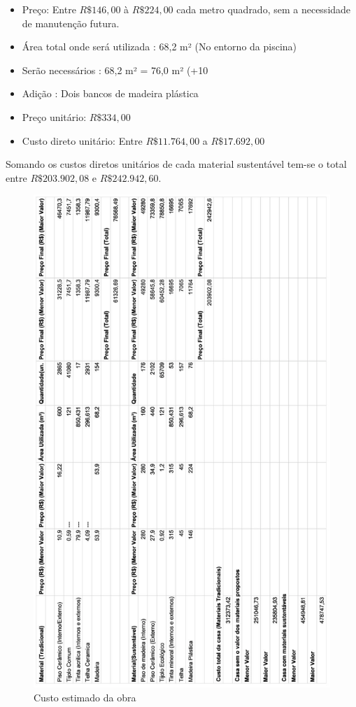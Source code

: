 \begin{itemize}

		\item Preço: Entre $R\$146,00$ à $R\$ 224,00$ cada metro quadrado, sem a necessidade de manutenção futura.

		\item Área total onde será utilizada : 68,2 m² (No entorno da piscina)

		\item Serão necessários :  68,2 m² = 76,0 m² (+10%

		\item Adição : Dois bancos de madeira plástica

		\item Preço unitário: $R\$ 334,00$

		\item Custo direto unitário: Entre $R\$ 11.764,00$ a $R\$17.692,00$

\end{itemize}


Somando os custos diretos unitários de cada material sustentável tem-se o total entre $R\$ 203.902,08$ e $R\$ 242.942,60$.

\begin{figure}[H]
  \begin{center}
	\includegraphics[keepaspectratio,scale=1,angle=0]{figuras/custos_da_casa.eps}
	\caption{Custo estimado da obra}
  \end{center}
\end{figure}
